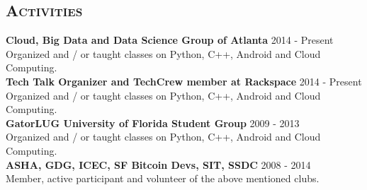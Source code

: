 \begin{resume}






\section{\textsc{Activities}}
\textbf{Cloud, Big Data and Data Science Group of Atlanta} \hfill 2014 - Present\\
Organized and / or taught classes on Python, C++, Android and Cloud Computing.\\
\textbf{Tech Talk Organizer and TechCrew member at Rackspace} \hfill 2014 - Present\\
Organized and / or taught classes on Python, C++, Android and Cloud Computing.\\
\textbf{GatorLUG University of Florida Student Group} \hfill 2009 - 2013\\
Organized and / or taught classes on Python, C++, Android and Cloud Computing.\\
\textbf{ASHA, GDG, ICEC, SF Bitcoin Devs, SIT, SSDC} \hfill 2008 - 2014\\
Member, active participant and volunteer of the above mentioned clubs.



\end{resume}
